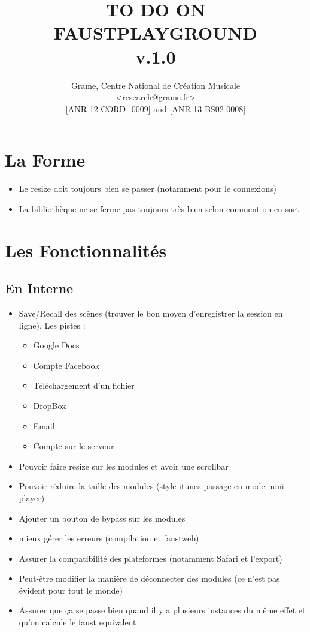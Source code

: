 \documentclass[a4paper]{article}
\begin{document}
\title{TO DO ON FAUSTPLAYGROUND \\ v.1.0}

\author{Grame, Centre National de Création Musicale\\
{\small <research@grame.fr>} \\
\vspace{2mm}
[ANR-12-CORD- 0009] and [ANR-13-BS02-0008]
}

\maketitle


\newpage
\section{La Forme}

\begin{itemize}
\item Le resize doit toujours bien se passer (notamment pour le connexions)
\item La bibliothèque ne se ferme pas toujours très bien selon comment on en sort
\end{itemize}

\section{Les Fonctionnalités}
\subsection{En Interne}
\begin{itemize}
\item Save/Recall des scènes (trouver le bon moyen d'enregistrer la session en ligne). 
Les pistes :
\begin{itemize}				
\item Google Docs
\item Compte Facebook
\item Téléchargement d'un fichier
\item DropBox
\item Email
\item Compte sur le serveur
\end{itemize}
\item Pouvoir faire resize sur les modules et avoir une scrollbar
\item Pouvoir réduire la taille des modules (style itunes passage en mode mini-player)
\item Ajouter un bouton de bypass sur les modules
\item mieux gérer les erreurs (compilation et faustweb)
\item Assurer la compatibilité des plateformes (notamment Safari et l'export)
\item Peut-être modifier la manière de déconnecter des modules (ce n'est pas évident pour tout le monde)
\item Assurer que ça se passe bien quand il y a plusieurs instances du même effet et qu'on calcule le faust equivalent
\end{itemize}
\end{document}
